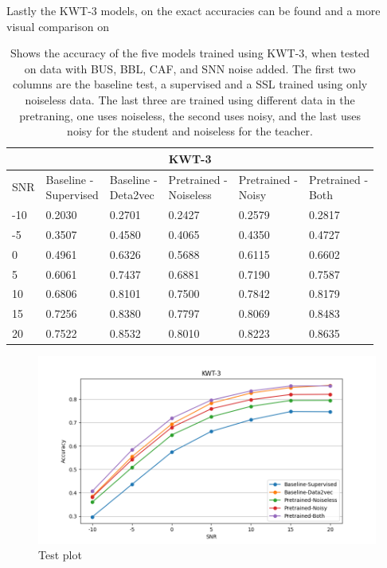 Lastly the KWT-3 models, on  the exact accuracies can be found and a more visual comparison on 

\begin{table}[H]
    \centering
    \begin{tabular}{@{}llllll@{}}
        \multicolumn{6}{c}{\textbf{KWT-3}}\\
        \toprule
        SNR    & \makecell[l]{ Baseline - \\ Supervised } & \makecell[l]{ Baseline - \\ Deta2vec } & \makecell[l]{ Pretrained - \\ Noiseless } & \makecell[l]{ Pretrained - \\ Noisy } & \makecell[l]{ Pretrained - \\ Both } \\ \midrule
        -10  & 0.2030 & 0.2701 & 0.2427 & 0.2579 & 0.2817 \\
        -5   & 0.3507 & 0.4580 & 0.4065 & 0.4350 & 0.4727 \\
        0    & 0.4961 & 0.6326 & 0.5688 & 0.6115 & 0.6602 \\
        5    & 0.6061 & 0.7437 & 0.6881 & 0.7190 & 0.7587 \\
        10   & 0.6806 & 0.8101 & 0.7500 & 0.7842 & 0.8179 \\
        15   & 0.7256 & 0.8380 & 0.7797 & 0.8069 & 0.8483 \\
        20   & 0.7522 & 0.8532 & 0.8010 & 0.8223 & 0.8635 \\
        
        \bottomrule
    \end{tabular}
    \caption{Shows the accuracy of the five models trained using KWT-3, when tested on data with BUS, BBL, CAF, and SNN noise added. The first two columns are the baseline test, a supervised and a SSL trained using only noiseless data. The last three are trained using different data in the pretraning, one uses noiseless, the second uses noisy, and the last uses noisy for the student and noiseless for the teacher.}
    \label{tab:KWT-3_snrmix_busxbblxcafxssn}
\end{table}

\begin{figure}[H]
    \centering
    \includegraphics[width=\textwidth]{incl/img/results/kwt3_busxbblxcafxsnn.png}
    \caption{Test plot}
    \label{fig:KWT-3_snrmix_busxbblxcafxssn}
\end{figure}